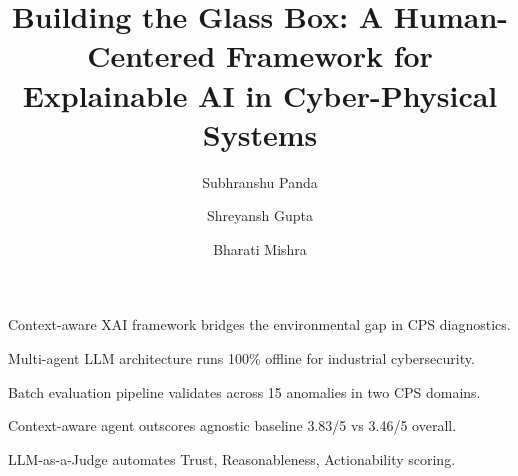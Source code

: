 \documentclass[a4paper,fleqn]{cas-dc}
\begin{document}
\let\WriteBookmarks\relax
\def\floatpagepagefraction{1}
\def\textpagefraction{.001}


\title[mode=title]{Building the Glass Box: A Human-Centered Framework for Explainable AI in Cyber-Physical Systems}

\author[1]{Subhranshu Panda}

\author[1]{Shreyansh Gupta}

\author[1]{Bharati Mishra}
\cormark[1]

\address[1]{Department of Computer Science and Engineering, International Institute of Information Technology (IIIT), Bhubaneswar, Odisha, India}


\begin{highlights}
\item Context-aware XAI framework bridges the environmental gap in CPS diagnostics.
\item Multi-agent LLM architecture runs 100\% offline for industrial cybersecurity.
\item Batch evaluation pipeline validates across 15 anomalies in two CPS domains.
\item Context-aware agent outscores agnostic baseline 3.83/5 vs 3.46/5 overall.
\item LLM-as-a-Judge automates Trust, Reasonableness, Actionability scoring.
\end{highlights}
\end{document}
